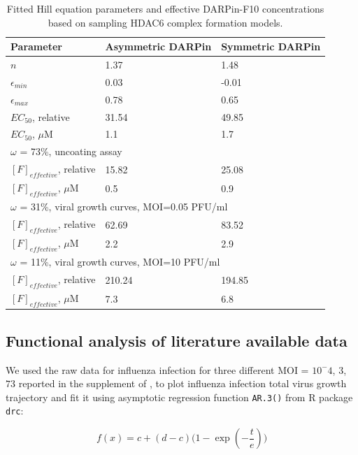 \begin{table}[h!]
\centering
\caption[Fitted Hill equation parameters and effective DARPin-F10 concentrations]{Fitted Hill equation parameters and effective DARPin-F10 concentrations based on sampling HDAC6 complex formation models.}
\label{table:DARPinFittingCoefficients}

\begin{tabular}{p{5cm} p{3cm} p{3cm}}
\hline 
\textbf{Parameter} & \textbf{Asymmetric DARPin} & \textbf{Symmetric DARPin}\\
\hline
$n$ &                 1.37&    1.48\\
$\epsilon_{min}$ &    0.03&    -0.01\\
$\epsilon_{max}$ &    0.78&    0.65\\
$EC_{50}$, relative &          31.54&    49.85\\
$EC_{50}$, $\mu$M &          1.1&    1.7\\
\hline
\multicolumn{3}{l}{$\omega$ = 73\%, uncoating assay}\\
$[F]_{effective}$, relative & 15.82 & 25.08\\
$[F]_{effective}$, $\mu$M & 0.5 & 0.9\\
\hline
\multicolumn{3}{l}{$\omega$ = 31\%, viral growth curves, MOI=0.05 PFU/ml}\\
$[F]_{effective}$, relative & 62.69 & 83.52\\
$[F]_{effective}$, $\mu$M & 2.2 & 2.9\\
\hline
\multicolumn{3}{l}{$\omega$ = 11\%, viral growth curves, MOI=10 PFU/ml}\\
$[F]_{effective}$, relative & 210.24 & 194.85\\
$[F]_{effective}$, $\mu$M & 7.3 & 6.8\\
\hline
\end{tabular}
\end{table}

\subsection{Functional analysis of literature available data}

We used the raw data for influenza infection for three different MOI = $10^-4$, $3$, $73$ reported in the supplement of \cite{rudiger2019multiscale}, to plot influenza infection total virus growth trajectory and fit it using asymptotic regression function \texttt{AR.3()} from R package \texttt{drc}:

\begin{equation}
f(x) = c + (d-c)\big(1-\exp(-\frac{t}{e})\big)
\label{eq:ar3function}
\end{equation}

